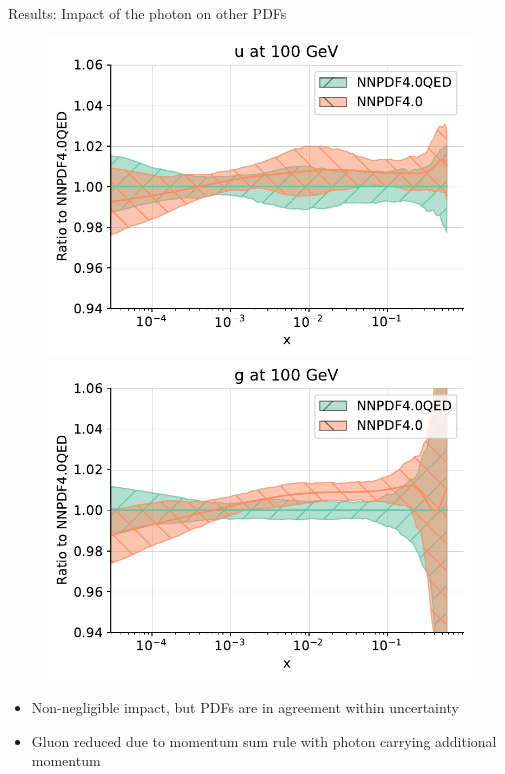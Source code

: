 \documentclass[8pt,t]{beamer}
\begin{document}
\begin{frame}{Results: Impact of the photon on other PDFs}

  \begin{figure}[!t]
    \centering
    \includegraphics[width=.49\textwidth]{figures/plot_pdfs_u_qed.pdf}
    \includegraphics[width=.49\textwidth]{figures/plot_pdfs_g_qed.pdf}\\
  \end{figure}

  \begin{itemize}
    \item Non-negligible impact, but PDFs are in agreement within uncertainty
    \item Gluon reduced due to momentum sum rule with photon carrying additional momentum
  \end{itemize}
\end{frame}


\end{document}
